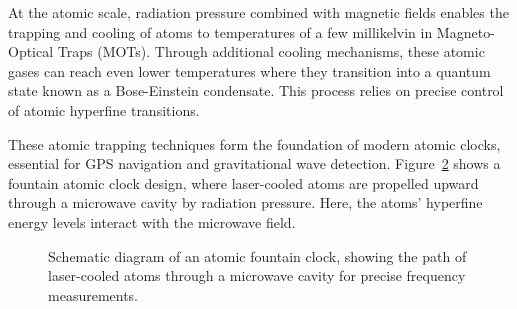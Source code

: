 \documentclass[
  a4paper,
]{book}
\begin{document}
\begin{figure}


\caption{\label{fig-traps-dna}}

\end{figure}%

At the atomic scale, radiation pressure combined with magnetic fields
enables the trapping and cooling of atoms to temperatures of a few
millikelvin in Magneto-Optical Traps (MOTs). Through additional cooling
mechanisms, these atomic gases can reach even lower temperatures where
they transition into a quantum state known as a Bose-Einstein
condensate. This process relies on precise control of atomic hyperfine
transitions.

These atomic trapping techniques form the foundation of modern atomic
clocks, essential for GPS navigation and gravitational wave detection.
Figure~\ref{fig-atomic-clock} shows a fountain atomic clock design,
where laser-cooled atoms are propelled upward through a microwave cavity
by radiation pressure. Here, the atoms' hyperfine energy levels interact
with the microwave field.

\begin{figure}


\caption{\label{fig-atomic-clock}Schematic diagram of an atomic fountain
clock, showing the path of laser-cooled atoms through a microwave cavity
for precise frequency measurements.}

\end{figure}%
\end{document}
